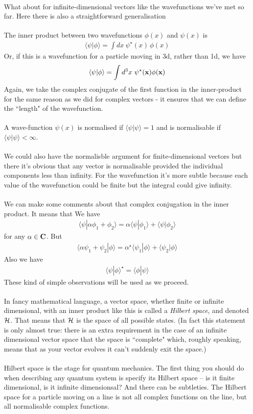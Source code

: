 \documentclass[12pt]{article}
\def\be{\begin{eqnarray}}
\def\ee{\end{eqnarray}}
\newcommand{\nn}{\nonumber}
\newcommand\para{\paragraph{}}
\newcommand{\co}{\color{olive}}
\newcommand{\bx}{{\bf x}}
\begin{document}
{\para
What about for infinite-dimensional vectors like the wavefunctions we've met so far. Here there is also a straightforward generalisation
%

\para
{\co The inner product between two wavefunctions $\phi(x)$ and $\psi(x)$ is
%
\be \langle \psi|\phi\rangle = \int dx\ \psi^\star(x)\,\phi(x) \nn\ee
%
Or, if this is a wavefunction for a particle moving in 3d, rather than 1d, we have
%
\be \langle{\psi}|{\phi} \rangle= \int d^3x\ \psi^\star(\bx)\phi(\bx)\label{inner}\ee
%
}
Again, we take the complex conjugate of the first function in the inner-product for the same reason as we did for complex vectors - it ensures that we can define the ``length" of the wavefunction. 

\para
{\co A wave-function $\psi(x)$ is normalised if $\langle \psi|\psi\rangle =1$ and is normalisable if$\langle \psi|\psi\rangle <\infty$.}

\para
We could also have the normalisble argument for finite-dimensional vectors but there it's obvious that any vector is normalisable provided the individual components less than infinity. For the wavefunction it's more subtle because each value of the wavefunction could be finite but the integral could give infinity.

\para
We can make some comments about that complex conjugation in the inner product. It means that {\co We have
%
\be \langle{\psi}|{\alpha\phi_1+\phi_2}\rangle = \alpha\langle{\psi}|{\phi_1}\rangle + \langle{\psi}|{\phi_2}\rangle\nn\ee
%
for any $\alpha \in {\bf C}$. But 
%
%
\be\langle{\alpha\psi_1+\psi_2}|{\phi}\rangle = \alpha^\star\langle{\psi_1}|{\phi}\rangle + \langle{\psi_2}|{\phi}\rangle\nn\ee
%
Also we have
%
\be \langle{\psi}|{\phi}\rangle^\star = \langle{\phi}|{\psi}\rangle\nn\ee
%
} These kind of simple observations will be used as we proceed. 



\para
{\co In  fancy mathematical language, a vector space, whether finite or infinite dimensional, with an inner product like this is called a {\it Hilbert space}, and denoted ${\cal H}$. That means that ${\cal H}$ is the space of all possible states.}
(In fact this statement is only almost true: there is an extra requirement in the case of an infinite dimensional vector space that the space is ``complete" which, roughly speaking, means that as your vector evolves it can't suddenly exit the space.)

\para
Hilbert space is the stage for quantum mechanics. The first thing you should do when describing any quantum system is specify its Hilbert space -- is it finite dimensional, is it infinite dimensionsal? And there can be subtleties. The Hilbert space for a particle moving on a line is not all complex functions on the line, but all normalisable complex functions. 

}
\end{document}
